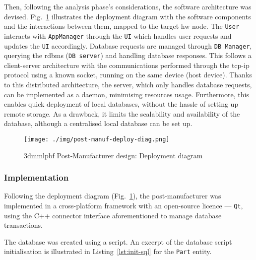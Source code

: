 Then, following the analysis phase's considerations, the software architecture was devised. Fig.~\ref{fig:post-manuf-deploy-diag}
illustrates the deployment diagram with the software components and the
interactions between them, mapped to the target \gls{hw} node. The
\texttt{User} interacts with \texttt{AppManager} through the \texttt{UI} which
handles user requests and updates the \texttt{UI} accordingly. Database
requests are managed through \texttt{DB Manager}, querying the \gls{rdbms}
(\texttt{DB server}) and
handling database responses. This follows a client-server architecture with the
communications performed through the \gls{tcp-ip} protocol using a known
socket, running on the same device (host device). Thanks to this distributed
architecture, the server, which only handles database requests, can be
implemented as a daemon, minimising resources usage. Furthermore, this enables
quick deployment of local databases, without the hassle of setting up remote
storage. As a drawback, it limits the scalability and availability of the
database, although a centralised local database can be set up.
%
\begin{figure}[!hbt]
  \centering
    \texttt{[image: ./img/post-manuf-deploy-diag.png]}
  \caption{\gls{3dmmlpbf} Post-Manufacturer design: Deployment diagram}%
  \label{fig:post-manuf-deploy-diag}
\end{figure}

\subsubsection{Implementation}%
\label{sec:post-manuf-implem}
Following the deployment diagram (Fig.~\ref{fig:post-manuf-deploy-diag}), the
post-manufacturer was implemented in a cross-platform framework with an
open-source licence --- \texttt{Qt}, using the C++ connector interface
aforementioned to manage database
transactions.

The database was created using a script. An excerpt of the database script
initialisation is illustrated in Listing~\ref{lst:init-sql} for the
\texttt{Part} entity.
%
%

